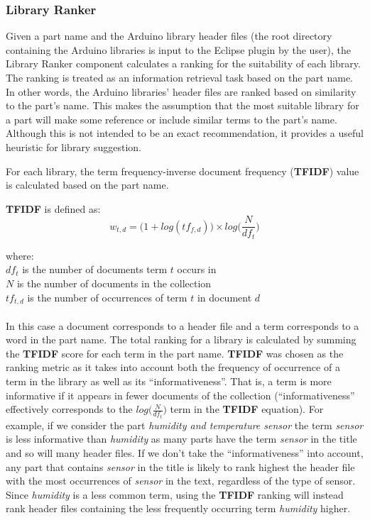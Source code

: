 \documentclass{UoYCSproject}
\newcommand\tab[1][1cm]{\hspace*{#1}}
\begin{document}
\subsubsection{Library Ranker} \label{lib_ranker}
Given a part name and the Arduino library header files (the root directory containing the Arduino libraries is input to the Eclipse plugin by the user), the Library Ranker component calculates a ranking for the suitability of each library. The ranking is treated as an information retrieval task based on the part name. In other words, the Arduino libraries' header files are ranked based on similarity to the part's name. This makes the assumption that the most suitable library for a part will make some reference or include similar terms to the part's name. Although this is not intended to be an exact recommendation, it provides a useful heuristic for library suggestion.

For each library, the term frequency-inverse document frequency (\textbf{TFIDF})\parencite{salton1986introduction} value is calculated based on the part name. 

\textbf{TFIDF} is defined as:
\begin{equation}
w_{t,d} = \big(1 + log(tf_{f,d})\big) \times log\bigg(\frac{N}{df_t}\bigg)
\end{equation}

where:\\
\tab$df_t$ is the number of documents term $t$ occurs in\\
\tab$N$ is the number of documents in the collection\\
\tab$tf_{t,d}$ is the number of occurrences of term $t$ in document $d$\\
\\
In this case a document corresponds to a header file and a term corresponds to a word in the part name. The total ranking for a library is calculated by summing the \textbf{TFIDF} score for each term in the part name.
\textbf{TFIDF} was chosen as the ranking metric as it takes into account both the frequency of occurrence of a term in the library as well as its ``informativeness''. That is, a term is more informative if it appears in fewer documents of the collection (``informativeness'' effectively corresponds to the $log\Big(\frac{N}{df_t}\Big)$ term in the \textbf{TFIDF} equation). For example, if we consider the part \textit{humidity and temperature sensor} the term \textit{sensor} is less informative than \textit{humidity} as many parts have the term \textit{sensor} in the title and so will many header files. If we don't take the ``informativeness'' into account, any part that contains \textit{sensor} in the title is likely to rank highest the header file with the most occurrences of \textit{sensor} in the text, regardless of the type of sensor. Since \textit{humidity} is a less common term, using the \textbf{TFIDF} ranking will instead rank header files containing the less frequently occurring term \textit{humidity} higher.
\end{document}
